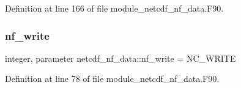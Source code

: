 Definition at line 166 of file module\+\_\+netcdf\+\_\+nf\+\_\+data.\+F90.

\mbox{\label{namespacenetcdf__nf__data_aaf3fef826de5a81142ab319ef0ed0539}} 
\subsubsection{\texorpdfstring{nf\+\_\+write}{nf\_write}}
{\footnotesize\ttfamily integer, parameter netcdf\+\_\+nf\+\_\+data\+::nf\+\_\+write = N\+C\+\_\+\+W\+R\+I\+TE}



Definition at line 78 of file module\+\_\+netcdf\+\_\+nf\+\_\+data.\+F90.

